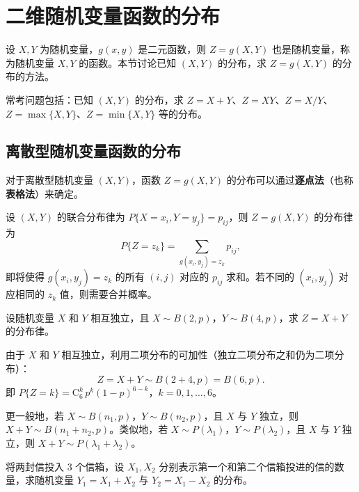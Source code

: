 \documentclass[lang=cn,11pt]{elegantbook}
\begin{document}
\section{二维随机变量函数的分布}

设 $X, Y$ 为随机变量，$g(x,y)$ 是二元函数，则 $Z = g(X,Y)$ 也是随机变量，称为随机变量 $X, Y$ 的函数。本节讨论已知 $(X,Y)$ 的分布，求 $Z = g(X,Y)$ 的分布的方法。

常考问题包括：已知 $(X,Y)$ 的分布，求 $Z = X + Y$、$Z = XY$、$Z = X/Y$、$Z = \max\{X,Y\}$、$Z = \min\{X,Y\}$ 等的分布。

\subsection{离散型随机变量函数的分布}

对于离散型随机变量 $(X,Y)$，函数 $Z = g(X,Y)$ 的分布可以通过\textbf{逐点法}（也称\textbf{表格法}）来确定。

\begin{property}[逐点法]\label{prop:pointwise-method} 
设 $(X,Y)$ 的联合分布律为 $P\{X = x_i, Y = y_j\} = p_{ij}$，则 $Z = g(X,Y)$ 的分布律为
\[
P\{Z = z_k\} = \sum_{g(x_i,y_j) = z_k}p_{ij},
\]
即将使得 $g(x_i, y_j) = z_k$ 的所有 $(i,j)$ 对应的 $p_{ij}$ 求和。若不同的 $(x_i, y_j)$ 对应相同的 $z_k$ 值，则需要合并概率。
\end{property}

\begin{exercise}\label{exer:3-6}
设随机变量 $X$ 和 $Y$ 相互独立，且 $X \sim B(2, p)$，$Y \sim B(4, p)$，求 $Z = X + Y$ 的分布律。
\end{exercise}

\begin{solution}
由于 $X$ 和 $Y$ 相互独立，利用二项分布的可加性（独立二项分布之和仍为二项分布）：
\[
Z = X + Y \sim B(2+4, p) = B(6, p).
\]
即 $P\{Z = k\} = \mathrm{C}_6^k\,p^k(1-p)^{6-k}$，$k = 0, 1, \dots, 6$。

\begin{note}
更一般地，若 $X \sim B(n_1, p)$，$Y \sim B(n_2, p)$，且 $X$ 与 $Y$ 独立，则 $X + Y \sim B(n_1 + n_2, p)$。类似地，若 $X \sim P(\lambda_1)$，$Y \sim P(\lambda_2)$，且 $X$ 与 $Y$ 独立，则 $X + Y \sim P(\lambda_1 + \lambda_2)$。
\end{note}
\end{solution}

\begin{exercise}[和与差的分布] \label{exer:3-6b}
将两封信投入 3 个信箱，设 $X_1, X_2$ 分别表示第一个和第二个信箱投进的信的数量，求随机变量 $Y_1 = X_1 + X_2$ 与 $Y_2 = X_1 - X_2$ 的分布。
\end{exercise}
\end{document}
